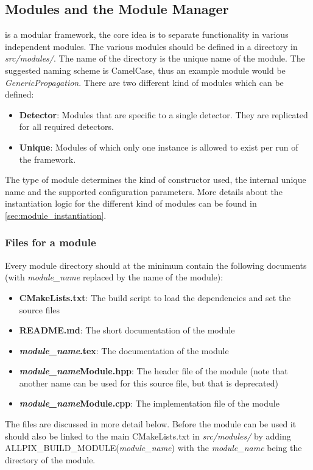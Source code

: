 \subsection{Modules and the Module Manager}
\label{sec:module_manager}
\apsq is a modular framework, the core idea is to separate functionality in various independent modules. The various modules should be defined in a directory in \textit{src/modules/}. The name of the directory is the unique name of the module. The suggested naming scheme is CamelCase, thus an example module would be \textit{GenericPropagation}. There are two different kind of modules which can be defined:
\begin{itemize}
\item \textbf{Detector}: Modules that are specific to a single detector. They are replicated for all required detectors.
\item \textbf{Unique}: Modules of which only one instance is allowed to exist per run of the framework.
\end{itemize}
The type of module determines the kind of constructor used, the internal unique name and the supported configuration parameters. More details about the instantiation logic for the different kind of modules can be found in \ref{sec:module_instantiation}.

\subsubsection{Files for a module}
\label{sec:module_files}
Every module directory should at the minimum contain the following documents (with \textit{module\_name} replaced by the name of the module):
\begin{itemize}
\item \textbf{CMakeLists.txt}: The build script to load the dependencies and set the source files
\item \textbf{README.md}: The short documentation of the module
\item \textbf{\textit{module\_name}.tex}: The documentation of the module
\item \textbf{\textit{module\_name}Module.hpp}: The header file of the module (note that another name can be used for this source file, but that is deprecated)
\item \textbf{\textit{module\_name}Module.cpp}: The implementation file of the module
\end{itemize}
The files are discussed in more detail below. Before the module can be used it should also be linked to the main CMakeLists.txt in \textit{src/modules/} by adding \\ ALLPIX\_BUILD\_MODULE(\textit{module\_name}) with the \textit{module\_name} being the directory of the module. 

